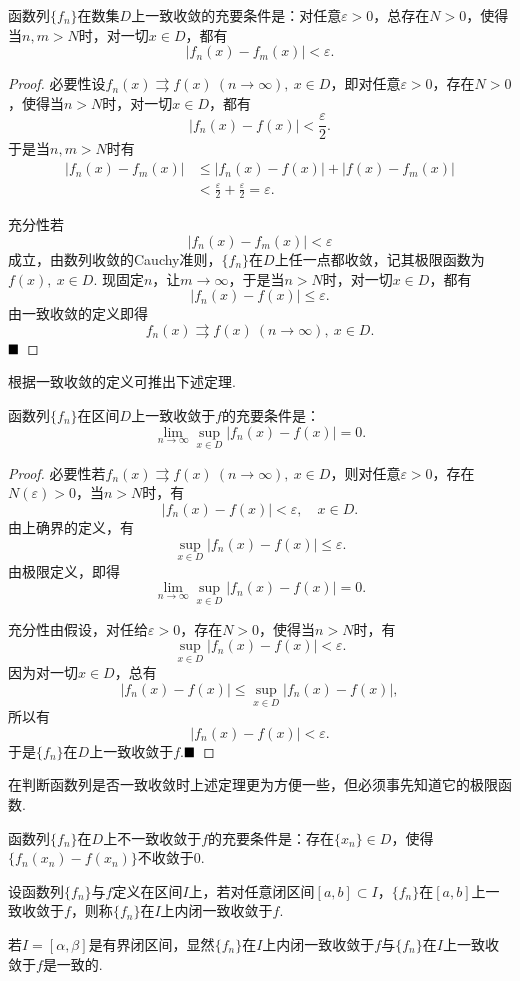 \begin{theorem}[函数列一致收敛的Cauchy准则]
	函数列$\{f_n\}$在数集$D$上一致收敛的充要条件是：对任意$\varepsilon>0$，总存在$N>0$，使得当$n,m>N$时，对一切$x\in D$，都有
	$$|f_n(x)-f_m(x)|<\varepsilon.$$
\end{theorem}
\begin{proof}
	{\heiti 必要性}\qquad 设$f_n(x)\rightrightarrows f(x)\ (n\to\infty),\ x\in D$，即对任意$\varepsilon>0$，存在$N>0$，使得当$n>N$时，对一切$x\in D$，都有
	$$|f_n(x)-f(x)|<\frac{\varepsilon}{2}.$$
	于是当$n,m>N$时有
	\begin{align*}
		|f_n(x)-f_m(x)|&\leqslant |f_n(x)-f(x)|+|f(x)-f_m(x)|\\
		&<\frac{\varepsilon}{2}+\frac{\varepsilon}{2}=\varepsilon.
	\end{align*}
	
	{\heiti 充分性}\qquad 若
	$$|f_n(x)-f_m(x)|<\varepsilon$$
	成立，由数列收敛的Cauchy准则，$\{f_n\}$在$D$上任一点都收敛，记其极限函数为$f(x),\ x\in D$. 现固定$n$，让$m\to\infty$，于是当$n>N$时，对一切$x\in D$，都有
	$$|f_n(x)-f(x)|\leqslant \varepsilon.$$
	由一致收敛的定义即得
	$$f_n(x)\rightrightarrows f(x)\ (n\to\infty),\ x\in D.$$
	$\hfill\blacksquare$
\end{proof}

根据一致收敛的定义可推出下述定理.
\begin{theorem}\label{chy}
	函数列$\{f_n\}$在区间$D$上一致收敛于$f$的充要条件是：
	$$\lim\limits_{n\to\infty}\sup\limits_{x\in D}|f_n(x)-f(x)|=0.$$
\end{theorem}
\begin{proof}
	{\heiti 必要性}\qquad 若$f_n(x)\rightrightarrows f(x)\ (n\to\infty),\ x\in D$，则对任意$\varepsilon>0$，存在$N(\varepsilon)>0$，当$n>N$时，有
	$$|f_n(x)-f(x)|<\varepsilon,\quad x\in D.$$
	由上确界的定义，有
	$$\sup\limits_{x\in D}|f_n(x)-f(x)|\leqslant\varepsilon.$$
	由极限定义，即得
	$$\lim\limits_{n\to\infty}\sup\limits_{x\in D}|f_n(x)-f(x)|=0.$$
	
	{\heiti 充分性}\qquad 由假设，对任给$\varepsilon>0$，存在$N>0$，使得当$n>N$时，有
	$$\sup\limits_{x\in D}|f_n(x)-f(x)|<\varepsilon.$$
	因为对一切$x\in D$，总有
	$$|f_n(x)-f(x)|\leqslant\sup\limits_{x\in D}|f_n(x)-f(x)|,$$
	所以有
	$$|f_n(x)-f(x)|<\varepsilon.$$
	于是$\{f_n\}$在$D$上一致收敛于$f$.$\hfill\blacksquare$
\end{proof}
\begin{remark}
	在判断函数列是否一致收敛时上述定理更为方便一些，但必须事先知道它的极限函数.
\end{remark}
\begin{corollary}
	函数列$\{f_n\}$在$D$上不一致收敛于$f$的充要条件是：存在$\{x_n\}\in D$，使得$\{f_n(x_n)-f(x_n)\}$不收敛于$0$.
\end{corollary}
\begin{definition}[内闭一致收敛]
	设函数列$\{f_n\}$与$f$定义在区间$I$上，若对任意闭区间$\left[a,b\right]\subset I$，$\{f_n\}$在$\left[a,b\right]$上一致收敛于$f$，则称$\{f_n\}$在$I$上{\heiti 内闭一致收敛}于$f$.
\end{definition}
\begin{remark}
	若$I=\left[\alpha,\beta\right]$是有界闭区间，显然$\{f_n\}$在$I$上内闭一致收敛于$f$与$\{f_n\}$在$I$上一致收敛于$f$是一致的.
\end{remark}

